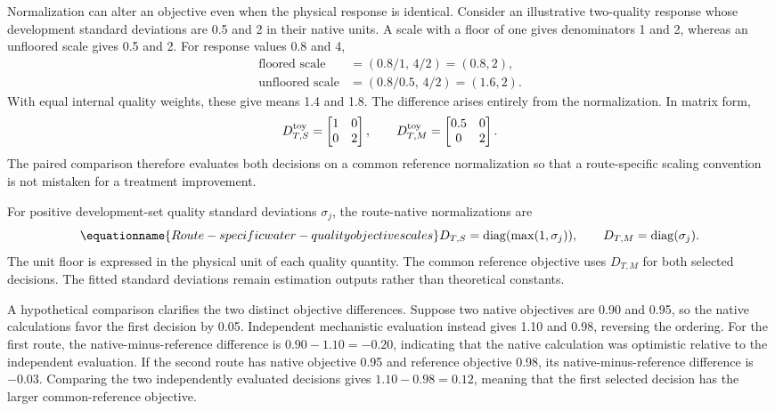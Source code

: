 Normalization can alter an objective even when the physical response is identical. Consider an illustrative two-quality response whose development standard deviations are 0.5 and 2 in their native units. A scale with a floor of one gives denominators 1 and 2, whereas an unfloored scale gives 0.5 and 2. For response values 0.8 and 4,
\[
\begin{aligned}
\text{floored scale}&=(0.8/1,\,4/2)=(0.8,2),\\
\text{unfloored scale}&=(0.8/0.5,\,4/2)=(1.6,2).
\end{aligned}
\]
With equal internal quality weights, these give means 1.4 and 1.8. The difference arises entirely from the normalization. In matrix form,
\[
D_{T,S}^{\rm toy}=\begin{bmatrix}1&0\\0&2\end{bmatrix},\qquad
D_{T,M}^{\rm toy}=\begin{bmatrix}0.5&0\\0&2\end{bmatrix}.
\]
The paired comparison therefore evaluates both decisions on a common reference normalization so that a route-specific scaling convention is not mistaken for a treatment improvement.

For positive development-set quality standard deviations $\sigma_j$, the route-native normalizations are
\begin{equation}
\equationname{Route-specific water-quality objective scales}
D_{T,S}=\operatorname{diag}(\max(1,\sigma_j)),\qquad
D_{T,M}=\operatorname{diag}(\sigma_j).
\label{eq:plant_route_normalization}
\end{equation}
The unit floor is expressed in the physical unit of each quality quantity. The common reference objective uses $D_{T,M}$ for both selected decisions. The fitted standard deviations remain estimation outputs rather than theoretical constants.

A hypothetical comparison clarifies the two distinct objective differences. Suppose two native objectives are 0.90 and 0.95, so the native calculations favor the first decision by 0.05. Independent mechanistic evaluation instead gives 1.10 and 0.98, reversing the ordering. For the first route, the native-minus-reference difference is $0.90-1.10=-0.20$, indicating that the native calculation was optimistic relative to the independent evaluation. If the second route has native objective 0.95 and reference objective 0.98, its native-minus-reference difference is $-0.03$. Comparing the two independently evaluated decisions gives $1.10-0.98=0.12$, meaning that the first selected decision has the larger common-reference objective.

